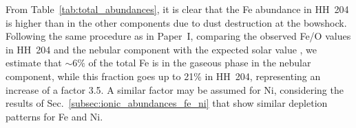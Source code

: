 \documentclass[twocolumn]{aastex63}
\newcommand{\jorge}[1]{{\color{magenta}J: #1}}
\newcommand{\cesar}[1]{{\color{red}C: #1}}
\begin{document}

From Table~\ref{tab:total_abundances}, it is clear that the Fe abundance in HH~204 is higher than in the other components due to dust destruction at the bowshock. Following the same procedure as in Paper~I, comparing the observed Fe/O values in HH~204 and the nebular component with the expected solar value \citep{lodders19}, we estimate that $\sim 6\%$ of the total Fe is in the gaseous phase in the nebular component, while this fraction goes up to 21\% in HH~204, representing an increase of a factor 3.5. A similar factor may be assumed for Ni, considering the results of Sec.~\ref{subsec:ionic_abundances_fe_ni} that show similar depletion patterns for Fe and Ni.

\end{document}
